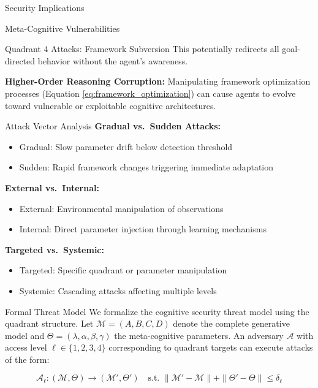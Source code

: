 \documentclass[
  ignorenonframetext,
]{beamer}
\providecommand{\tightlist}{%
  \setlength{\itemsep}{0pt}\setlength{\parskip}{0pt}}
\begin{document}
\begin{frame}{Security Implications}
\begin{block}{Meta-Cognitive Vulnerabilities}
\begin{block}{Quadrant 4 Attacks: Framework Subversion}
This potentially redirects all goal-directed behavior without the
agent's awareness.

\textbf{Higher-Order Reasoning Corruption:} Manipulating framework
optimization processes (Equation \eqref{eq:framework_optimization}) can
cause agents to evolve toward vulnerable or exploitable cognitive
architectures.
\end{block}

\begin{block}{Attack Vector Analysis}
\protect{}\label{attack-vector-analysis}
\textbf{Gradual vs.~Sudden Attacks:}

\begin{itemize}
\tightlist
\item
  Gradual: Slow parameter drift below detection threshold
\item
  Sudden: Rapid framework changes triggering immediate adaptation
\end{itemize}

\textbf{External vs.~Internal:}

\begin{itemize}
\tightlist
\item
  External: Environmental manipulation of observations
\item
  Internal: Direct parameter injection through learning mechanisms
\end{itemize}

\textbf{Targeted vs.~Systemic:}

\begin{itemize}
\tightlist
\item
  Targeted: Specific quadrant or parameter manipulation
\item
  Systemic: Cascading attacks affecting multiple levels
\end{itemize}
\end{block}
\end{block}

\begin{block}{Formal Threat Model}
\protect{}\label{sec:threat_model}
We formalize the cognitive security threat model using the quadrant
structure. Let \(\mathcal{M} = (A, B, C, D)\) denote the complete
generative model and \(\Theta = (\lambda, \alpha, \beta, \gamma)\) the
meta-cognitive parameters. An adversary \(\mathcal{A}\) with access
level \(\ell \in \{1,2,3,4\}\) corresponding to quadrant targets can
execute attacks of the form:

\begin{equation}
\mathcal{A}_\ell: (\mathcal{M}, \Theta) \rightarrow (\mathcal{M}', \Theta') \quad \text{s.t. } \|\mathcal{M}' - \mathcal{M}\| + \|\Theta' - \Theta\| \leq \delta_\ell
\label{eq:threat_model}
\end{equation}


\end{block}
\end{frame}
\end{document}
